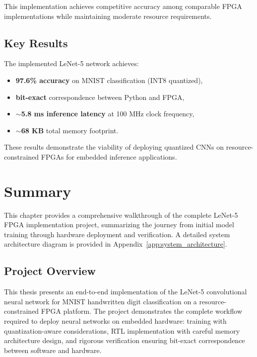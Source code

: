 \documentclass[12pt,a4paper]{report}
\begin{document}
This implementation achieves competitive accuracy among comparable FPGA implementations while maintaining moderate resource requirements.

\section{Key Results}

The implemented LeNet-5 network achieves:
\begin{itemize}
    \item \textbf{97.6\% accuracy} on MNIST classification (INT8 quantized),
    \item \textbf{bit-exact} correspondence between Python and FPGA,
    \item \textbf{$\sim$5.8 ms inference latency} at 100 MHz clock frequency,
    \item \textbf{$\sim$68 KB} total memory footprint.
\end{itemize}

These results demonstrate the viability of deploying quantized CNNs on resource-constrained FPGAs for embedded inference applications.

\chapter{Summary}

This chapter provides a comprehensive walkthrough of the complete LeNet-5 FPGA implementation project, summarizing the journey from initial model training through hardware deployment and verification. A detailed system architecture diagram is provided in Appendix~\ref{app:system_architecture}.

\section{Project Overview}

This thesis presents an end-to-end implementation of the LeNet-5 convolutional neural network for MNIST handwritten digit classification on a resource-constrained FPGA platform. The project demonstrates the complete workflow required to deploy neural networks on embedded hardware: training with quantization-aware considerations, RTL implementation with careful memory architecture design, and rigorous verification ensuring bit-exact correspondence between software and hardware.
\end{document}
